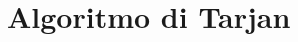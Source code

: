 
\ifsubfile
\usepackage{../settings/subfile}
\appendix


\fi
\chapter{Algoritmo di Tarjan}

\lipsum[0]

\ifsubfile

\fi